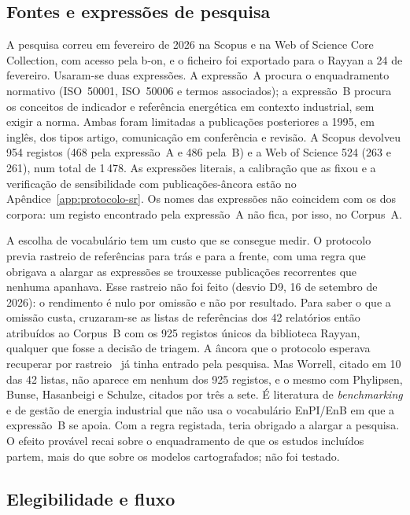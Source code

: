 \subsection{Fontes e expressões de pesquisa}

A pesquisa correu em fevereiro de 2026 na Scopus e na Web of Science Core
Collection, com acesso pela b-on, e o ficheiro foi exportado para o Rayyan
a 24 de fevereiro. Usaram-se duas expressões. A expressão~A procura o
enquadramento normativo (ISO~50001, ISO~50006 e termos associados); a
expressão~B procura os conceitos de indicador e referência energética em
contexto industrial, sem exigir a norma. Ambas foram limitadas a publicações
posteriores a 1995, em inglês, dos tipos artigo, comunicação em conferência
e revisão. A Scopus devolveu 954 registos (468 pela expressão~A e 486 pela~B)
e a Web of Science 524 (263 e 261), num total de 1\,478. As expressões
literais, a calibração que as fixou e a verificação de sensibilidade com
publicações-âncora estão no Apêndice~\ref{app:protocolo-sr}. Os nomes das
expressões não coincidem com os dos corpora: um registo encontrado pela
expressão~A não fica, por isso, no Corpus~A.

A escolha de vocabulário tem um custo que se consegue medir. O protocolo
previa rastreio de referências para trás e para a frente, com uma regra que obrigava a alargar as expressões se trouxesse
publicações recorrentes que nenhuma apanhava. Esse rastreio não foi feito (desvio D9, 16 de setembro de 2026):
o rendimento é nulo por omissão e não por resultado. Para saber o que a
omissão custa, cruzaram-se as listas de referências dos 42 relatórios então
atribuídos ao Corpus~B com os 925 registos únicos da biblioteca Rayyan,
qualquer que fosse a decisão de triagem. A âncora que o protocolo esperava
recuperar por rastreio~\cite{Karcher2015} já tinha entrado pela pesquisa.
Mas Worrell, citado em 10 das 42 listas, não aparece em nenhum dos 925
registos, e o mesmo com Phylipsen, Bunse, Hasanbeigi e Schulze, citados por três
a sete. É literatura de \emph{benchmarking} e de
gestão de energia industrial que não usa o vocabulário EnPI/EnB em que a
expressão~B se apoia. Com a regra registada, teria obrigado a alargar a pesquisa. O efeito provável recai sobre o enquadramento de que
os estudos incluídos partem, mais do que sobre os modelos cartografados;
não foi testado.

\subsection{Elegibilidade e fluxo}

